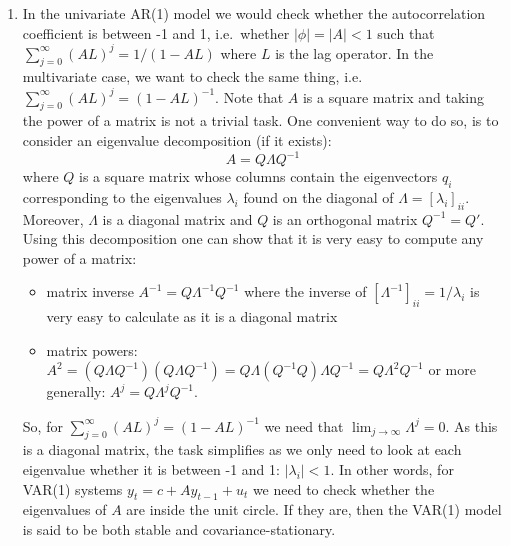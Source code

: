 \begin{enumerate}
\item 
In the univariate AR{(1)} model we would check whether the autocorrelation coefficient is between -1 and 1, i.e.\
  whether \(|\phi| = |A|<1\) such that \(\sum_{j=0}^\infty {(AL)}^j=1/(1-AL)\)
  where \(L\) is the lag operator.
In the multivariate case, we want to check the same thing, i.e.\
  \(\sum_{j=0}^\infty {(AL)}^j={(1-AL)}^{-1}\).
Note that \(A\) is a square matrix and taking the power of a matrix is not a trivial task.
One convenient way to do so, is to consider an eigenvalue decomposition (if it exists):
\[A= Q \Lambda Q^{-1}\]
  where \(Q\) is a square matrix whose columns contain the eigenvectors \(q_i\)
  corresponding to the eigenvalues \(\lambda_i\) found on the diagonal of \(\Lambda = {[\lambda_i]}_{ii}\).
Moreover, \(\Lambda \) is a diagonal matrix and \(Q\) is an orthogonal matrix \(Q^{-1}=Q'\).
Using this decomposition one can show that it is very easy to compute any power of a matrix:
\begin{itemize}
\item matrix inverse \(A^{-1} = Q \Lambda^{-1} Q^{-1}\) where the inverse of \({[\Lambda^{-1}]}_{ii} = 1/\lambda_i\) is very easy to calculate as it is a diagonal matrix
\item matrix powers: \(A^2=(Q\Lambda Q^{-1})(Q\Lambda Q^{-1})=Q\Lambda (Q^{-1}Q) \Lambda Q^{-1} = Q \Lambda^2 Q^{-1}\) or more generally: \(A^j = Q \Lambda^j Q^{-1}\).
\end{itemize}
So, for \(\sum_{j=0}^\infty {(AL)}^j={(1-AL)}^{-1}\) we need that \(\lim_{j\rightarrow \infty}\Lambda^j=0\).
As this is a diagonal matrix, the task simplifies as we only need to look at each eigenvalue whether it is between -1 and 1: \(|\lambda_i|<1\).
In other words, for VAR{(1)} systems \(y_t = c + A y_{t-1} + u_t\) we need to check whether the eigenvalues of \(A\) are inside the unit circle.
If they are, then the VAR{(1)} model is said to be both stable and covariance-stationary.


\end{enumerate}
